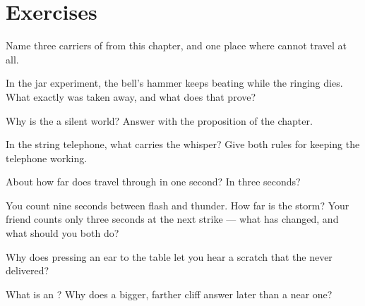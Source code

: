 \section{Exercises}

\begin{exercise}[$\star$]\label{exo:g4:how-sound-travels:1}
Name three carriers of  from this chapter, and one place where
 cannot travel at all.
\end{exercise}

\begin{exercise}[$\star$]\label{exo:g4:how-sound-travels:2}
In the jar experiment, the bell's hammer keeps beating while the
ringing dies. What exactly was taken away, and what does that
prove?
\end{exercise}

\begin{exercise}[$\star$]\label{exo:g4:how-sound-travels:3}
Why is the  a silent world? Answer with the proposition of the
chapter.
\end{exercise}

\begin{exercise}[$\star$]\label{exo:g4:how-sound-travels:4}
In the string telephone, what carries the whisper? Give both rules
for keeping the telephone working.
\end{exercise}

\begin{exercise}[$\star$]\label{exo:g4:how-sound-travels:5}
About how far does  travel through  in one second? In three
seconds?
\end{exercise}

\begin{exercise}[$\star$]\label{exo:g4:how-sound-travels:6}
You count nine seconds between flash and thunder. How far is the
storm? Your friend counts only three seconds at the next strike ---
what has changed, and what should you both do?
\end{exercise}

\begin{exercise}[$\star$]\label{exo:g4:how-sound-travels:7}
Why does pressing an ear to the table let you hear a scratch that
the  never delivered?
\end{exercise}

\begin{exercise}[$\star$]\label{exo:g4:how-sound-travels:8}
What is an ? Why does a bigger, farther cliff answer later than
a near one?
\end{exercise}

